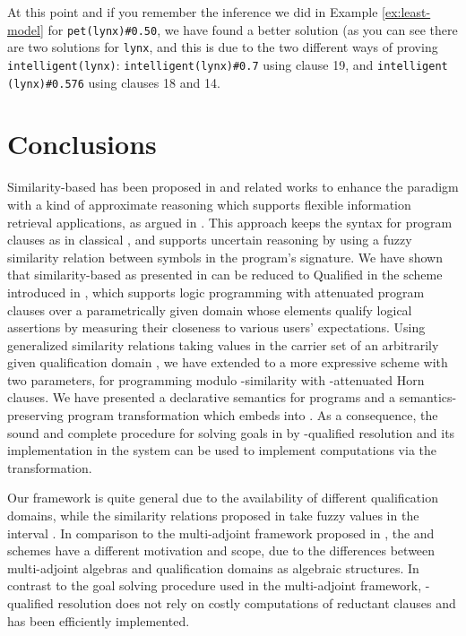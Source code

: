 \documentclass{sigplanconf}
\theoremstyle{definition}
\theoremstyle{plain}
\begin{document}
At this point and if you remember the inference we did in Example \ref{ex:least-model} for \texttt{pet(lynx)\#0.50}, we have found a better solution (as you can see there are two solutions for \texttt{lynx}, and this is due to the two different ways of proving \texttt{intelligent(lynx)}: \texttt{intelligent(lynx)\#0.7} using clause 19, and \texttt{intelligent (lynx)\#0.576} using clauses 18 and 14.

\section{Conclusions} \label{Conclusions}

Similarity-based  has been proposed in \cite{Ses02} and related works to enhance the  paradigm with a kind of approximate reasoning which supports flexible information retrieval applications, as argued in \cite{LSS04,MOV04}. This approach keeps the syntax for program  clauses as in classical , and supports uncertain reasoning by using a fuzzy similarity relation  between symbols in the program's signature. We have shown that similarity-based  as presented in \cite{Ses02} can be reduced to Qualified  in the  scheme introduced in \cite{RR08}, which supports  logic programming with attenuated program clauses over a parametrically given domain   whose elements  qualify logical assertions by measuring their closeness to various users' expectations. Using  generalized similarity relations taking values in the carrier set of an
arbitrarily  given qualification domain ,  we  have extended  to a more expressive scheme  with two parameters, for programming modulo -similarity with -attenuated Horn clauses. We have presented a declarative semantics for  programs and a semantics-preserving program transformation which embeds  into . As a consequence, the sound and complete procedure for solving goals in  by -qualified  resolution and its implementation in the
 system \cite{RR08} can be used to implement  computations via the transformation.

Our framework is quite general due to the availability of different qualification domains, while the similarity relations proposed in \cite{Ses02} take fuzzy values in the interval . In comparison to the multi-adjoint framework proposed in \cite{MOV04}, the  and  schemes have a different motivation and scope, due to the differences between multi-adjoint algebras and qualification domains as algebraic structures. In contrast to the goal solving procedure used in the multi-adjoint framework, -qualified  resolution does not
rely on costly computations of reductant clauses and has been efficiently implemented.
\end{document}
